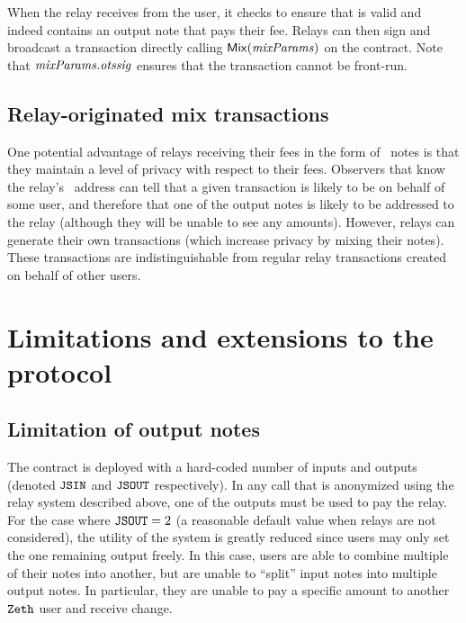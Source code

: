 When the relay receives \mixparams{} from the user, it checks to ensure that \mixparams{} is valid and indeed contains an output note that pays their fee. Relays can then sign and broadcast a transaction directly calling $\mathsf{Mix}(\mathit{mixParams})$ on the \mixer{} contract. Note that $\mathit{mixParams}.\mathit{otssig}$ ensures that the transaction cannot be front-run.

\subsection{Relay-originated mix transactions}

One potential advantage of relays receiving their fees in the form of \zeth~notes is that they maintain a level of privacy with respect to their fees. Observers that know the relay's \ethereum~address can tell that a given transaction is likely to be on behalf of some user, and therefore that one of the output notes is likely to be addressed to the relay (although they will be unable to see any amounts). However, relays can generate their own \mix{} transactions (which increase privacy by mixing their notes). These \mix{} transactions are indistinguishable from regular relay transactions created on behalf of other users.

\section{Limitations and extensions to the protocol}\label{relay-private-fees:extensions}

\subsection{Limitation of output notes}\label{relay-private-fees:extensions:jsout-limitation}

The \mixer{} contract is deployed with a hard-coded number of inputs and outputs (denoted $\mathtt{JSIN}$ and $\mathtt{JSOUT}$ respectively). In any \mix{} call that is anonymized using the relay system described above, one of the outputs must be used to pay the relay. For the case where $\mathtt{JSOUT} = 2$ (a reasonable default value when relays are not considered), the utility of the system is greatly reduced since users may only set the one remaining output freely. In this case, users are able to combine multiple of their notes into another, but are unable to ``split'' input notes into multiple output notes. In particular, they are unable to pay a specific amount to another $\texttt{Zeth}$ user and receive change.

